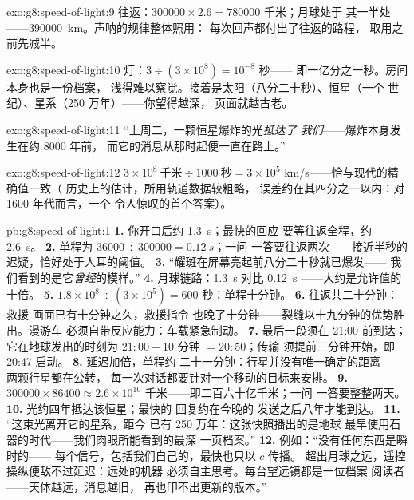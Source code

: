 \begin{solution}{exo:g8:speed-of-light:9}
往返：$300000 \times 2.6 = 780000$ 千米；月球处于
其一半处——\qty{390000}{km}。声呐的规律整体照用：
每次回声都付出了往返的路程，
取用之前先减半。
\end{solution}

\begin{solution}{exo:g8:speed-of-light:10}
灯：$3 \div (3 \times 10^{8}) = 10^{-8}$ 秒——
即一亿分之一秒。房间本身也是一份档案，
浅得难以察觉。接着是太阳（八分二十秒）、恒星（一个
世纪）、星系（250 万年）——你望得越深，
页面就越古老。
\end{solution}

\begin{solution}{exo:g8:speed-of-light:11}
“上周二，一颗恒星爆炸的光\emph{抵达了
我们}——爆炸本身发生在约 $8000$ 年前，
而它的消息从那时起便一直在路上。”
\end{solution}

\begin{solution}{exo:g8:speed-of-light:12}
$3 \times 10^{8}\ \text{千米} \div 1000\ \text{秒} = 3 \times
10^{5}$ \unit{km/s}——恰与现代的精确值一致（
历史上的估计，所用轨道数据较粗略，
误差约在其四分之一以内：对 1600 年代而言，一个
令人惊叹的首个答案）。
\end{solution}

\begin{solution}{pb:g8:speed-of-light:1}
\textbf{1.} 你开口后约 \qty{1.3}{s}；最快的回应
要等往返全程，约
\qty{2.6}{s}。
\textbf{2.} 单程为 $36000 \div 300000 = \qty{0.12}{s}$；一问
一答要往返两次——接近半秒的
迟疑，恰好处于人耳的阈值。
\textbf{3.} “耀斑在屏幕亮起前八分二十秒就已爆发——
我们看到的是它\emph{曾经}的模样。”
\textbf{4.} 月球链路：\qty{1.3}{s} 对比 \qty{0.12}{s}
——大约是允许值的十倍。
\textbf{5.} $1.8 \times 10^{8} \div (3 \times 10^{5}) = 600$
秒：单程十分钟。
\textbf{6.} 往返共二十分钟：救援
画面已有十分钟之久，救援指令
也晚了十分钟——裂缝以十九分钟的优势胜出。漫游车
必须自带反应能力：车载紧急制动。
\textbf{7.} 最后一段须在 21:00 前到达；它在地球发出的时刻为
$21{:}00 - 10$ 分钟 $= 20{:}50$；传输
须提前三分钟开始，即 20:47 启动。
\textbf{8.} 延迟加倍，单程约
二十一分钟：行星并没有唯一确定的距离——两颗行星都在公转，
每一次对话都要针对一个移动的目标来安排。
\textbf{9.} $300000 \times 86400 \approx 2.6 \times 10^{10}$
千米——即二百六十亿千米；一问
一答要整整两天。
\textbf{10.} 光约四年抵达该恒星；最快的
回复约在今晚的
发送之后八年才能到达。
\textbf{11.} “这束光离开它的星系，距今
已有 250 万年：这张快照播出的是地球
最早使用石器的时代——我们肉眼所能看到的最深
一页档案。”
\textbf{12.} 例如：“没有任何东西是瞬时的——
每个信号，包括我们自己的，最快也只以 $c$ 传播。
超出月球之远，遥控操纵便敌不过延迟：远处的机器
必须自主思考。每台望远镜都是一位档案
阅读者——天体越远，消息越旧，
再也印不出更新的版本。”
\end{solution}
